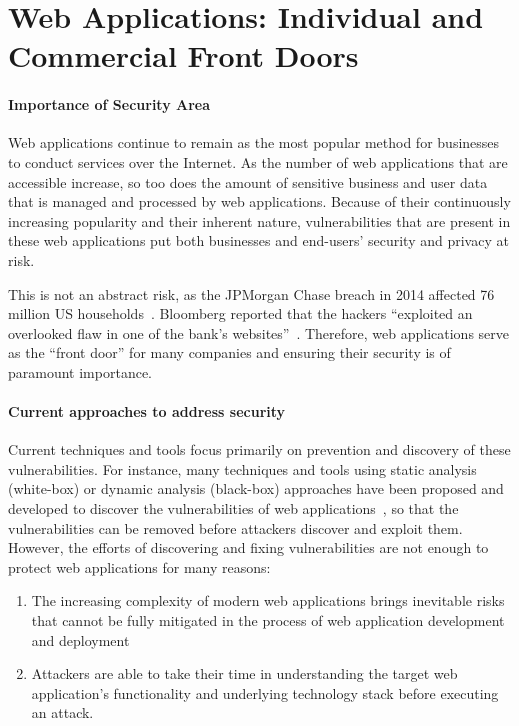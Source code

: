 \section{Web Applications: Individual and Commercial Front Doors }
\paragraph{Importance of Security Area}
Web applications continue to remain as the most popular method for businesses to conduct services over the Internet. As the number of web applications that are accessible increase, so too does the amount of sensitive business and user data that is managed and processed by web applications.
Because of their continuously increasing popularity and their inherent nature, vulnerabilities that are present in these web applications put both businesses and end-users' security and privacy at risk.

This is not an abstract risk, as the JPMorgan Chase breach in 2014
affected 76 million US households~\cite{jpmorgan-chase:nyt}. Bloomberg
reported that the hackers ``exploited an overlooked flaw in one of the
bank's websites''~\cite{jpmorgan-chase:bloomberg}. Therefore, web applications serve as the ``front door'' for
many companies and ensuring their security is of paramount
importance. 

\paragraph{Current approaches to address security}
Current techniques and tools focus primarily on prevention and discovery of these vulnerabilities. For instance, many techniques and tools using static analysis (white-box) or dynamic analysis (black-box) approaches have been proposed and developed to discover the vulnerabilities of web applications~\cite{balzarotti2008saner,felmetsger2010toward,jovanovic2010static,doupe12:enemy-of-the-state,doupe13:dedacota},
so that the vulnerabilities can be removed before attackers discover and exploit them. 
However, the efforts of discovering and fixing vulnerabilities are not enough to protect web applications for many reasons:
\begin{enumerate}
	\item The increasing complexity of modern web applications brings inevitable risks that cannot be fully mitigated in the process of web application development and deployment
	\item Attackers are able to take their time in understanding the target web application's functionality and underlying technology stack before executing an attack.
\end{enumerate}

